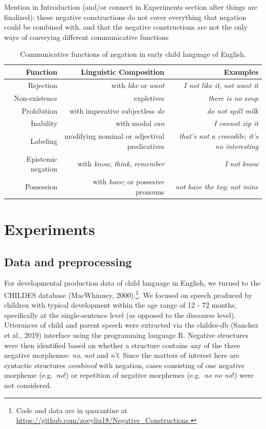 \documentclass[10pt, letterpaper]{article}
\begin{document}
Mention in Introduction (and/or connect in Experiments section after
things are finalized): these negative constructions do not cover
everything that negation could be combined with, and that the negative
constructions are not the only ways of conveying different communicative
functions

\begin{table}[h]
\small
\centering
\begin{tabular}{rrr}
  \hline
 \textbf{Function} & \textbf{Linguistic Composition} & \textbf{Examples} \\
  \hline
Rejection & with \textit{like} or \textit{want} & \textit{I not like it}, \textit{not want it}  \\
Non-existence & expletives & \textit{there is no soup} \\
Prohibition & with imperative subjectless \textit{do} & \textit{do not spill milk} \\
Inability & with modal \textit{can} & \textit{I cannot zip it} \\
Labeling & modifying nominal or adjectival predicatives & \textit{that's not a crocodile}; \textit{it's no interesting} \\
Epistemic negation & with \textit{know}, \textit{think}, \textit{remember}  & \textit{I not know} \\
Possession & with \textit{have}; or possesive pronouns & \textit{not have the toy}; \textit{not mine} \\
   \hline
\end{tabular}
\caption{Communicative functions of negation in early child language of English.}
\end{table}

\hypertarget{experiments}{%
\section{Experiments}\label{experiments}}

\hypertarget{data-and-preprocessing}{%
\subsection{Data and preprocessing}\label{data-and-preprocessing}}

For developmental production data of child language in English, we
turned to the CHILDES database (MacWhinney,
2000).\footnote{Code and data are in quarantine at \url{https://github.com/zoeyliu18/Negative_Constructions.}}.
We focused on speech produced by children with typical development
within the age range of 12 - 72 months, specifically at the
single-sentence level (as opposed to the discourse level). Utterances of
child and parent speech were extracted via the childes-db (Sanchez et
al., 2019) interface using the programming language R. Negative
structures were then identified based on whether a structure contains
any of the three negative morphemes: \emph{no}, \emph{not} and
\emph{n't}. Since the matters of interest here are syntactic structures
\emph{combined} with negation, cases consisting of one negative morpheme
(e.g.~\emph{no}!) or repetition of negative morphemes (e.g.~\emph{no no
no}!) were not considered.
\end{document}
